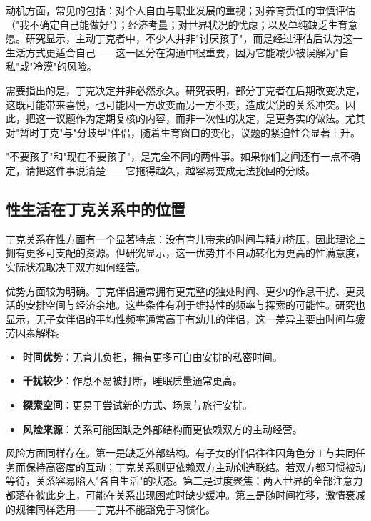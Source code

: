 \documentclass[12pt,UTF8]{ctexbook}
\newcommand{\keyword}[1]{\textbf{#1}}
\begin{document}
动机方面，常见的包括：对个人自由与职业发展的重视；对养育责任的审慎评估（"我不确定自己能做好"）；经济考量；对世界状况的忧虑；以及单纯缺乏生育意愿。研究显示，主动丁克者中，不少人并非"讨厌孩子"，而是经过评估后认为这一生活方式更适合自己——这一区分在沟通中很重要，因为它能减少被误解为"自私"或"冷漠"的风险。

需要指出的是，丁克决定并非必然永久。研究表明，部分丁克者在后期改变决定，这既可能带来喜悦，也可能因一方改变而另一方不变，造成尖锐的关系冲突。因此，把这一议题作为定期复核的内容，而非一次性的决定，是更务实的做法。尤其对"暂时丁克"与"分歧型"伴侣，随着生育窗口的变化，议题的紧迫性会显著上升。

\begin{tcolorbox}[colback=pink!5!white,colframe=red!50!black,title=贴心小叮咛]
	"不要孩子"和"现在不要孩子"，是完全不同的两件事。如果你们之间还有一点不确定，请把这件事说清楚——它拖得越久，越容易变成无法挽回的分歧。
\end{tcolorbox}
\subsection{性生活在丁克关系中的位置}

丁克关系在性方面有一个显著特点：没有育儿带来的时间与精力挤压，因此理论上拥有更多可支配的资源。但研究显示，这一优势并不自动转化为更高的性满意度，实际状况取决于双方如何经营。

优势方面较为明确。丁克伴侣通常拥有更完整的独处时间、更少的作息干扰、更灵活的安排空间与经济余地。这些条件有利于维持性的频率与探索的可能性。研究也显示，无子女伴侣的平均性频率通常高于有幼儿的伴侣，这一差异主要由时间与疲劳因素解释。

\begin{itemize}
	\item \keyword{时间优势}：无育儿负担，拥有更多可自由安排的私密时间。
	\item \keyword{干扰较少}：作息不易被打断，睡眠质量通常更高。
	\item \keyword{探索空间}：更易于尝试新的方式、场景与旅行安排。
	\item \keyword{风险来源}：关系可能因缺乏外部结构而更依赖双方的主动经营。
\end{itemize}

风险方面同样存在。第一是缺乏外部结构。有子女的伴侣往往因角色分工与共同任务而保持高密度的互动；丁克关系则更依赖双方主动创造联结。若双方都习惯被动等待，关系容易陷入"各自生活"的状态。第二是过度聚焦：两人世界的全部注意力都落在彼此身上，可能在关系出现困难时缺少缓冲。第三是随时间推移，激情衰减的规律同样适用——丁克并不能豁免于习惯化。
\end{document}
